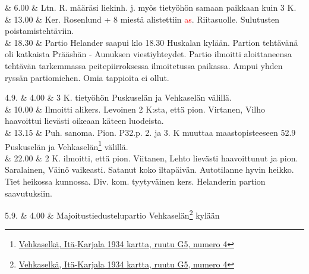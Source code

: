 \documentclass[11pt,a5paper,oneside]{book}
\begin{document}
& 6.00 & Ltn. R. määräsi liekinh. j. myös tietyöhön samaan paikkaan kuin 3 K. \newline \\

& 13.00 & Ker. Rosenlund + 8 miestä alistettiin \textcolor{red}{as}. Riitasuolle. Sulutusten poistamistehtäviin. \newline \\

& 18.30 & Partio Helander saapui klo 18.30 Huskalan kylään. Partion tehtävänä oli katkaista Prääshän - Aunuksen viestiyhteydet. Partio ilmoitti aloittaneensa tehtävän tarkemmassa peitepiirroksessa ilmoitetussa paikassa. Ampui yhden ryssän partiomiehen. Omia tappioita ei ollut. \\
\newpage

4.9. & 4.00 & 3 K. tietyöhön Puskuselän ja Vehkaselän välillä. \\

& 10.00 & Ilmoitti alikers. Levoinen 2 K:sta, että pion. Virtanen, Vilho haavoittui lievästi oikeaan käteen luodeista. \newline \\

& 13.15 & Puh. sanoma. Pion. P32.p. 2. ja 3. K muuttaa maastopisteeseen 52.9 Puskuselän ja Vehkaselän\footnote{\href{https://www.google.fi/maps/place/61\%C2\%B057'10.9\%22N+32\%C2\%B055'38.5\%22E/@61.953019,32.9266963,477m}{Vehkaselkä, Itä-Karjala 1934 kartta, ruutu G5, numero 4}} välillä. \\

& 22.00 & 2 K. ilmoitti, että pion. Viitanen, Lehto lievästi haavoittunut ja pion. Saralainen, Väinö vaikeasti. \newline Satanut koko iltapäivän. \newline Autotilanne hyvin heikko. \newline Tiet heikossa kunnossa. \newline Div. kom. tyytyväinen kers. Helanderin partion saavutuksiin. \\

\taulustop


5.9. & 4.00 & Majoitustiedustelupartio Vehkaselän\footnote{\href{https://www.google.fi/maps/place/61\%C2\%B057'10.9\%22N+32\%C2\%B055'38.5\%22E/@61.953019,32.9266963,477m}{Vehkaselkä, Itä-Karjala 1934 kartta, ruutu G5, numero 4}} kylään \newline \\
\end{document}
